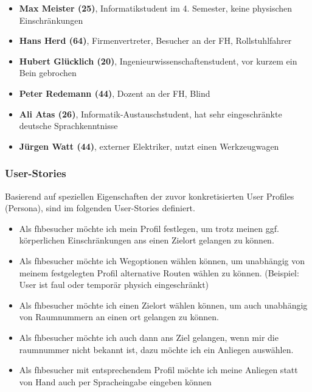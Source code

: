 \begin{itemize}
  \item \textbf{Max Meister (25)}, Informatikstudent im 4. Semester, keine physischen Einschränkungen
  \item \textbf{Hans Herd (64)}, Firmenvertreter, Besucher an der FH, Rollstuhlfahrer
  \item \textbf{Hubert Glücklich (20)}, Ingenieurwissenschaftenstudent, vor kurzem ein Bein gebrochen
  \item \textbf{Peter Redemann (44)}, Dozent an der FH, Blind
  \item \textbf{Ali Atas (26)}, Informatik-Austauschstudent, hat sehr eingeschränkte deutsche Sprachkenntnisse
  \item \textbf{Jürgen Watt (44)}, externer Elektriker, nutzt einen Werkzeugwagen 
\end{itemize}

\subsubsection*{User-Stories}
Basierend auf speziellen Eigenschaften der zuvor konkretisierten User Profiles (Persona), sind im folgenden User-Stories definiert.
\begin{itemize}
\item Als \gls{fhbesucher} möchte ich mein Profil festlegen, um trotz meinen ggf. körperlichen Einschränkungen ans einen Zielort gelangen zu können.
\item Als \gls{fhbesucher} möchte ich Wegoptionen wählen können, um unabhängig von meinem festgelegten Profil alternative Routen wählen zu können. (Beispiel: User ist faul oder temporär physich eingeschränkt)
\item Als \gls{fhbesucher} möchte ich einen Zielort wählen können, um auch unabhängig von Raumnummern an einen \gls{ort} gelangen zu können.
\item Als \gls{fhbesucher} möchte ich auch dann ans Ziel gelangen, wenn mir die \gls{raum}nummer nicht bekannt ist, dazu möchte ich ein Anliegen auswählen.
\item Als \gls{fhbesucher} mit entsprechendem Profil möchte ich meine Anliegen statt von Hand auch per Spracheingabe eingeben können
\end{itemize}

